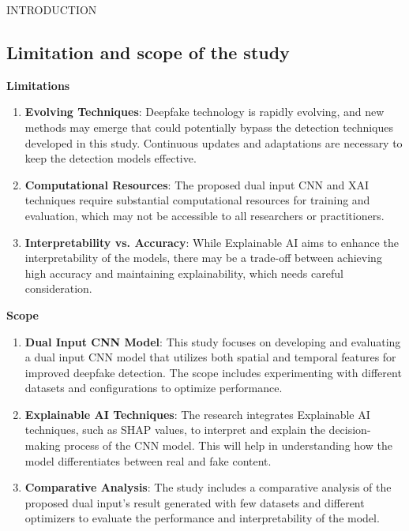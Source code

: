 \begin{section}[]{\uppercase{Introduction}}
    \subsection{Limitation and scope of the study}
    \textbf{Limitations}
    \begin{enumerate}
        \item \textbf{Evolving Techniques}: Deepfake technology is rapidly evolving, and new methods may emerge that could potentially bypass the detection techniques developed in this study. Continuous updates and adaptations are necessary to keep the detection models effective.
        \item \textbf{Computational Resources}: The proposed dual input CNN and XAI techniques require substantial computational resources for training and evaluation, which may not be accessible to all researchers or practitioners.
        \item \textbf{Interpretability vs. Accuracy}: While Explainable AI aims to enhance the interpretability of the models, there may be a trade-off between achieving high accuracy and maintaining explainability, which needs careful consideration.
    \end{enumerate}

    \noindent\textbf{Scope}
    \begin{enumerate}
        \item \textbf{Dual Input CNN Model}: This study focuses on developing and evaluating a dual input CNN model that utilizes both spatial and temporal features for improved deepfake detection. The scope includes experimenting with different datasets and configurations to optimize performance.
        \item \textbf{Explainable AI Techniques}: The research integrates Explainable AI techniques, such as SHAP values, to interpret and explain the decision-making process of the CNN model. This will help in understanding how the model differentiates between real and fake content.
        \item \textbf{Comparative Analysis}: The study includes a comparative analysis of the proposed dual input's result generated with few datasets and different optimizers to evaluate the performance and interpretability of the model.
    \end{enumerate}

\end{section}

\pagebreak
